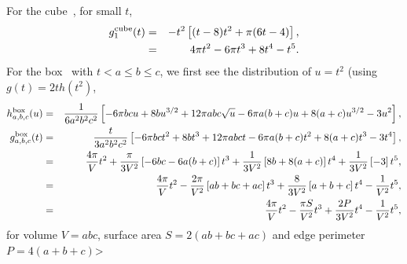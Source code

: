 \documentclass{article}
\begin{document}
For the cube~\cite{weisstein:_cube_line_picking}, for small $t$,
\begin{eqnarray}
  g^{\rm cube}_{1}(t) & = &  -t^2 \left[ (t-8)t^2 + \pi (6 t - 4) \right], \nonumber \\
                    & = & 4 \pi t^2 - 6 \pi t^3 + 8 t^4 - t^5.
\end{eqnarray}
For the box~\cite{philip:_probab_distr_distan_between_two} with $t < a
\leq b \leq c$, we first see the distribution  of $u=t^2$ (using $g(t)
= 2 t h(t^2)$, 
\begin{eqnarray}
  h^{\rm box}_{a,b,c}(u) & = &
  \frac{1}{6 a^2 b^2 c^2} \left[
    - 6 \pi b c u + 8 b u^{3/2}
    +12 \pi a b c \sqrt u - 6 \pi a(b + c)u + 8(a + c) u^{3/2} - 3 u^2
    \right], \nonumber \\
  g^{\rm box}_{a,b,c}(t)  & = &
  \frac{t }{3 a^2 b^2 c^2} \left[
    - 6 \pi b c t^2 + 8 b t^{3}
    +12 \pi a b c t - 6 \pi a(b + c)t^2 + 8(a + c) t^{3} - 3 t^4
    \right], \nonumber \\
 & = & \frac{4 \pi}{V} t^2
       + \frac{\pi }{3 V^2} \left[ -6 b c - 6 a (b+c) \right] t^3
       + \frac{1}{3 V^2} \left[ 8 b + 8 (a+c) \right] t^4
       + \frac{1}{3 V^2} \left[ - 3 \right] t^5, \nonumber \\
 & = & \frac{4 \pi}{V} t^2
       - \frac{2 \pi }{ V^2} \left[ a b + bc + a c \right] t^3
       + \frac{8}{3 V^2} \left[ a + b + c \right] t^4
       - \frac{1}{V^2} t^5,  \nonumber \\
 & = & \frac{4 \pi}{V} t^2
       - \frac{\pi S}{ V^2} t^3
       + \frac{2 P}{3 V^2}  t^4
       - \frac{1}{V^2} t^5, 
\end{eqnarray}
for volume $V = a b c$, surface area $S = 2(a b + bc + a c)$ and edge
perimeter $P = 4(a + b + c)$>
\end{document}
